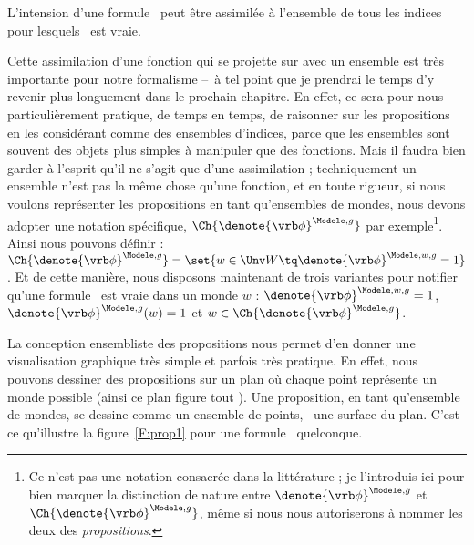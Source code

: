 \begin{point}\label{pt:prop°}
L'intension d'une formule \vrb\phi\ peut être assimilée à l'ensemble de tous les indices pour lesquels \vrb\phi\ est vraie.
\end{point}

\largerpage

Cette assimilation d'une fonction qui se projette sur  avec un ensemble est très importante pour notre formalisme --~à tel point que je prendrai le temps d'y revenir plus longuement dans le prochain chapitre. 
En effet, ce sera pour nous particulièrement pratique, de temps en temps, de raisonner sur les propositions en les considérant comme des ensembles d'indices, parce que les ensembles sont souvent des objets plus simples à manipuler que des fonctions.
Mais il faudra bien garder à l'esprit qu'il ne s'agit que d'une assimilation ; techniquement un ensemble n'est pas la même chose qu'une fonction, et en toute rigueur, si nous voulons représenter les propositions en tant qu'ensembles de mondes, nous devons adopter une notation spécifique, \(\Ch{\denote{\vrb\phi}^{\Modele,g}}\) par exemple\footnote{Ce n'est pas une notation consacrée dans la littérature ; je l'introduis ici pour bien marquer la distinction de nature entre \({\denote{\vrb\phi}^{\Modele,g}}\) et \(\Ch{\denote{\vrb\phi}^{\Modele,g}}\), même si nous nous autoriserons à nommer les deux des \emph{propositions}. }.  Ainsi nous pouvons définir : \(\Ch{\denote{\vrb\phi}^{\Modele,g}}=\set{w \in \Unv W \tq \denote{\vrb\phi}^{\Modele,w,g}=1}\). 
Et de cette manière, nous disposons maintenant de trois variantes pour notifier qu'une formule \vrb\phi\ est vraie dans un monde $w$ : \(\denote{\vrb\phi}^{\Modele,w,g}=1\), \(\denote{\vrb\phi}^{\Modele,g}(w)=1\) et \(w\in\Ch{\denote{\vrb\phi}^{\Modele,g}}\).

La conception ensembliste des propositions nous permet d'en donner une visualisation graphique très simple et parfois très pratique. 
En effet, nous pouvons dessiner des propositions sur un plan où chaque point représente 
un monde possible  (ainsi ce plan figure tout ).
Une proposition, en tant qu'ensemble de mondes,  se dessine comme un
ensemble de points, \ie\ une surface du plan. C'est ce qu'illustre la figure~\ref{F:prop1} pour une formule \vrb\phi\ quelconque. 



